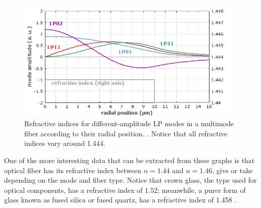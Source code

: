 \begin{figure}[htbp]
    \centering
    \includegraphics[width=11cm]{images/Appendices/step_index_fiber_modes.png}
    \caption{Refractive indices for different-amplitude LP modes in a multimode fiber according to their radial position. \protect\cite{FiberOptics_Refractive_Index}. Notice that all refractive indices vary around 1.444.}
    \label{fig:multi-mode_fibre_refractive_index}
\end{figure}

One of the more interesting data that can be extracted from these graphs is that optical fiber has its refractive index between $n = 1.44$ and $n = 1.46$, give or take depending on the mode and fiber type. Notice that crown glass, the type used for optical components, has a refractive index of 1.52; meanwhile, a purer form of glass known as fused silica or fused quartz, has a refractive index of 1.458 \cite{Hecht:Refractive_Index}.